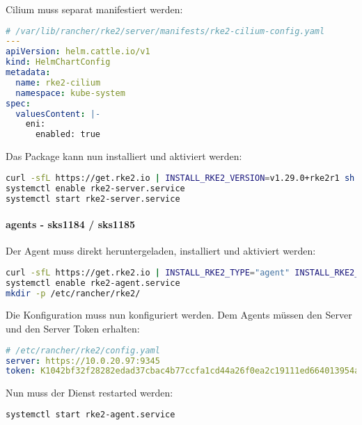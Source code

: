 Cilium muss separat manifestiert werden:
\lstset{style=gra_codestyle}
\begin{lstlisting}[language=yaml, caption=rke2 server - cilium-config.yaml,captionpos=b,label={lst:rke2-server-cilium-config.yaml},breaklines=true]
# /var/lib/rancher/rke2/server/manifests/rke2-cilium-config.yaml
---
apiVersion: helm.cattle.io/v1
kind: HelmChartConfig
metadata:
  name: rke2-cilium
  namespace: kube-system
spec:
  valuesContent: |-
    eni:
      enabled: true
\end{lstlisting}

Das Package kann nun installiert und aktiviert werden:
\lstset{style=gra_codestyle}
\begin{lstlisting}[language=bash, caption=rke2 server installieren,captionpos=b,label={lst:install-rke2-server},breaklines=true]
curl -sfL https://get.rke2.io | INSTALL_RKE2_VERSION=v1.29.0+rke2r1 sh -
systemctl enable rke2-server.service
systemctl start rke2-server.service
\end{lstlisting}

\paragraph{agents - sks1184 / sks1185}
Der Agent muss direkt heruntergeladen, installiert und aktiviert werden:
\lstset{style=gra_codestyle}
\begin{lstlisting}[language=bash, caption=rke2 agenten installieren,captionpos=b,label={lst:install-rke2-agent},breaklines=true]
curl -sfL https://get.rke2.io | INSTALL_RKE2_TYPE="agent" INSTALL_RKE2_VERSION=v1.29.0+rke2r1 sh -
systemctl enable rke2-agent.service
mkdir -p /etc/rancher/rke2/
\end{lstlisting}

Die Konfiguration muss nun konfiguriert werden.
Dem Agents müssen den Server und den Server Token erhalten:
\lstset{style=gra_codestyle}
\begin{lstlisting}[language=yaml, caption=rke2 agent - config.yaml,captionpos=b,label={lst:rke2-agent-config.yaml},breaklines=true]
# /etc/rancher/rke2/config.yaml
server: https://10.0.20.97:9345
token: K1042bf32f28282edad37cbac4b77ccfa1cd44a26f0ea2c19111ed664013954a326::server:7a430a28b29501b778543f0882a156b8
\end{lstlisting}

Nun muss der Dienst restarted werden:
\lstset{style=gra_codestyle}
\begin{lstlisting}[language=bash, caption=-rke2 agent service restart,captionpos=b,label={lst:rke2-agent-service-restart},breaklines=true]
systemctl start rke2-agent.service
\end{lstlisting}


